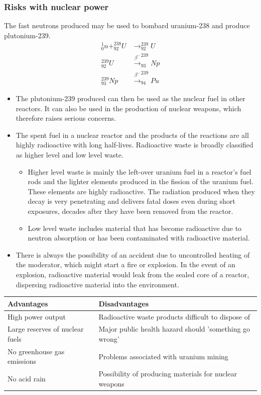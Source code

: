 \documentclass[a4paper,12pt]{article}
\begin{document}
\subsubsection*{Risks with nuclear power}
The fast neutrons produced may be used to bombard uranium-238 and produce plutonium-239.
\[
\begin{aligned}
^1_0n + ^{238}_{92}U &\rightarrow ^{239}_{92}U\\
^{239}_{92}U &\xrightarrow{\beta^-} ^{239}_{93}Np\\
^{239}_{93}Np &\xrightarrow{\beta^-} ^{239}_{94}Pu
\end{aligned}\]
\begin{itemize}
  \item The plutonium-239 produced can then be used as the nuclear fuel in other reactors. It can also be used in the production of nuclear weapons, which therefore raises serious concerns.
  \item The spent fuel in a nuclear reactor and the products of the reactions are all highly radioactive with long half-lives. Radioactive waste is broadly classified as higher level and low level waste.
  \begin{itemize}
    \item Higher level waste is mainly the left-over uranium fuel in a reactor's fuel rods and the lighter elements produced in the fission of the uranium fuel. These elements are highly radioactive. The radiation produced when they decay is very penetrating and delivers fatal doses even during short exposures, decades after they have been removed from the reactor.
    \item Low level waste includes material that has become radioactive due to neutron absorption or has been contaminated with radioactive material. 
  \end{itemize}
  \item There is always the possibility of an accident due to uncontrolled heating of the moderator, which might start a fire or explosion. In the event of an explosion, radioactive material would leak from the sealed core of a reactor, dispersing radioactive material into the environment.
\end{itemize}
\begin{center}
\begin{tabularx}{\textwidth}{@{}|Y |Y |@{}}
\toprule
\textbf{Advantages} & \textbf{Disadvantages}\\
\midrule
High power output & Radioactive waste products difficult to dispose of\\
\midrule
Large reserves of nuclear fuels & Major public health hazard should 'something go wrong'\\
\midrule
No greenhouse gas emissions & Problems associated with uranium mining\\
\midrule
No acid rain & Possibility of producing materials for nuclear weapons\\
\bottomrule
\end{tabularx}
\end{center}
\end{document}
